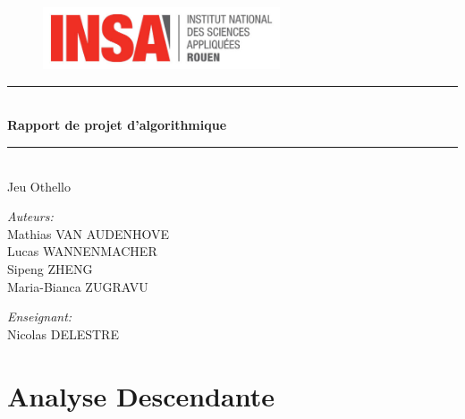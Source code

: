 \documentclass{article}
\author{}
\date{Octobre 2019}
\newcommand{\HRule}{\rule{\linewidth}{0.5mm}}
\begin{document}
\begin{titlepage}

\begin{figure}
    \centering
    \includegraphics[width=7cm]{logo.jpg}
\end{figure}
\begin{center}
    \HRule \\[0.4cm]
{ \huge \bfseries Rapport de projet d'algorithmique}\\[0.4cm]
\HRule \\[0.5cm]
{\Large{Jeu Othello}\\
\vspace{2cm}}
{\large \makeatletter
\@date
\makeatother}
\end{center}

\vspace{6cm}
\begin{minipage}{0.4\textwidth}
\begin{flushleft} \large
\emph{Auteurs:}\\
Mathias \textsc{VAN AUDENHOVE} \\
Lucas \textsc{WANNENMACHER} \\
Sipeng \textsc{ZHENG} \\
Maria-Bianca \textsc{ZUGRAVU} \\

\end{flushleft}
\end{minipage}
\begin{minipage}{0.4\textwidth}
\begin{flushright} \large
\emph{Enseignant:} \\
Nicolas \textsc{DELESTRE} \\
\end{flushright}
\end{minipage}
\end{titlepage}


\newpage
\tableofcontents
\newpage

\section{Analyse Descendante}
\end{document}
